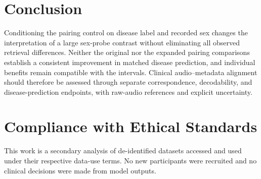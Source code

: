 \documentclass{article}
\begin{document}
\section{Conclusion}

Conditioning the pairing control on disease label and recorded sex changes
the interpretation of a large sex-probe contrast without eliminating all
observed retrieval differences. Neither the original nor the expanded
pairing comparisons establish a consistent improvement in matched disease
prediction, and individual benefits remain compatible with the intervals.
Clinical audio--metadata alignment should therefore be assessed through
separate correspondence, decodability, and disease-prediction endpoints,
with raw-audio references and explicit uncertainty.

\section*{Compliance with Ethical Standards}
This work is a secondary analysis of de-identified datasets accessed and
used under their respective data-use terms. No new participants were
recruited and no clinical decisions were made from model outputs.



\end{document}
